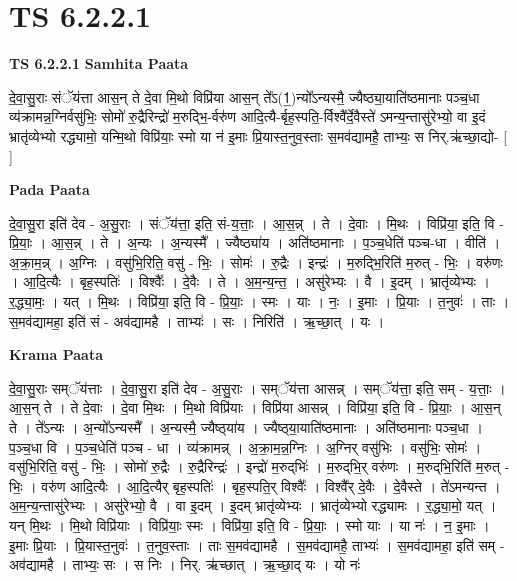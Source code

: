 \documentclass[17pt]{extarticle}
\begin{document}
\section{ TS 6.2.2.1 }

\textbf{TS 6.2.2.1 } \newline
\textbf{Samhita Paata} \newline

दे॒वा॒सु॒राः संॅय॑त्ता आस॒न् ते दे॒वा मि॒थो विप्रि॑या आस॒न् ते᳚ऽ(1॒)न्यो᳚ऽन्यस्मै॒ ज्यैष्ठ्या॒याति॑ष्ठमानाः पञ्च॒धा व्य॑क्रामन्न॒ग्निर्वसु॑भिः॒ सोमो॑ रु॒द्रैरिन्द्रो॑ म॒रुद्भि॒-र्वरु॑ण आदि॒त्यै-र्बृह॒स्पति॒-र्विश्वै᳚र्दे॒वैस्ते॑ ऽमन्य॒न्तासु॑रेभ्यो॒ वा इ॒दं भ्रातृ॑व्येभ्यो रद्ध्यामो॒ यन्मि॒थो विप्रि॑याः॒ स्मो या न॑ इ॒माः प्रि॒यास्त॒नुव॒स्ताः स॒मव॑द्यामहै॒ ताभ्यः॒ स निर्.ऋ॑च्छा॒द्यो- [  ] \newline

\textbf{Pada Paata} \newline

दे॒वा॒सु॒रा इति॑ देव - अ॒सु॒राः । संॅय॑त्ता॒ इति॒ सं-य॒त्ताः॒ । आ॒स॒न्न् । ते । दे॒वाः । मि॒थः । विप्रि॑या॒ इति॒ वि - प्रि॒याः॒ । आ॒स॒न्न् । ते । अ॒न्यः । अ॒न्यस्मै᳚ । ज्यैष्ठ्या॑य । अति॑ष्ठमानाः । प॒ञ्च॒धेति॑ पञ्च-धा । वीति॑ । अ॒क्रा॒म॒न्न् । अ॒ग्निः । वसु॑भि॒रिति॒ वसु॑ - भिः॒ । सोमः॑ । रु॒द्रैः । इन्द्रः॑ । म॒रुद्भि॒रिति॑ म॒रुत् - भिः॒ । वरु॑णः । आ॒दि॒त्यैः । बृह॒स्पतिः॑ । विश्वैः᳚ । दे॒वैः । ते । अ॒म॒न्य॒न्त॒ । असु॑रेभ्यः । वै । इ॒दम् । भ्रातृ॑व्येभ्यः । र॒द्ध्या॒मः॒ । यत् । मि॒थः । विप्रि॑या॒ इति॒ वि - प्रि॒याः॒ । स्मः । याः । नः॒ । इ॒माः । प्रि॒याः । त॒नुवः॑ । ताः । स॒मव॑द्यामहा॒ इति॑ सं - अव॑द्यामहै । ताभ्यः॑ । सः । निरिति॑ । ऋ॒च्छा॒त् । यः ।  \newline


\textbf{Krama Paata} \newline

दे॒वा॒सु॒राः सम्ॅय॑त्ताः । दे॒वा॒सु॒रा इति॑ देव - अ॒सु॒राः । सम्ॅय॑त्ता आसन्न् । सम्ॅय॑त्ता॒ इति॒ सम् - य॒त्ताः॒ । आ॒स॒न् ते । ते दे॒वाः । दे॒वा मि॒थः । मि॒थो विप्रि॑याः । विप्रि॑या आसन्न् । विप्रि॑या॒ इति॒ वि - प्रि॒याः॒ । आ॒स॒न् ते । ते᳚ऽन्यः । अ॒न्यो᳚ऽन्यस्मै᳚ । अ॒न्यस्मै॒ ज्यैष्ठ्‍या॑य । ज्यैष्ठ्‍या॒याति॑ष्ठमानाः । अति॑ष्ठमानाः पञ्च॒धा । प॒ञ्च॒धा वि । प॒ञ्च॒धेति॑ पञ्च - धा । व्य॑क्रामन्न् । अ॒क्रा॒म॒न्न॒ग्निः । अ॒ग्निर् वसु॑भिः । वसु॑भिः॒ सोमः॑ । वसु॑भि॒रिति॒ वसु॑ - भिः॒ । सोमो॑ रु॒द्रैः । रु॒द्रैरिन्द्रः॑ । इन्द्रो॑ म॒रुद्‌भिः॑ । म॒रुद्‌भि॒र् वरु॑णः । म॒रुद्‌भि॒रिति॑ म॒रुत् - भिः॒ । वरु॑ण आदि॒त्यैः । आ॒दि॒त्यैर् बृह॒स्पतिः॑ । बृह॒स्पति॒र् विश्वैः᳚ । विश्वै᳚र् दे॒वैः । दे॒वैस्ते । ते॑ऽमन्यन्त । अ॒म॒न्य॒न्तासु॑रेभ्यः । असु॑रेभ्यो॒ वै । वा इ॒दम् । इ॒दम् भ्रातृ॑व्येभ्यः । भ्रातृ॑व्येभ्यो रद्ध्यामः । र॒द्ध्या॒मो॒ यत् । यन् मि॒थः । मि॒थो विप्रि॑याः । विप्रि॑याः॒ स्मः । विप्रि॑या॒ इति॒ वि - प्रि॒याः॒ । स्मो याः । या नः॑ । न॒ इ॒माः । इ॒माः प्रि॒याः । प्रि॒यास्त॒नुवः॑ । त॒नुव॒स्ताः । ताः स॒मव॑द्यामहै । स॒मव॑द्यामहै॒ ताभ्यः॑ । स॒मव॑द्यामहा॒ इति॑ सम् - अव॑द्यामहै । ताभ्यः॒ सः । स निः । निर्. ऋ॑च्छात् । ऋ॒च्छा॒द् यः । यो नः॑ \newline
\end{document}
